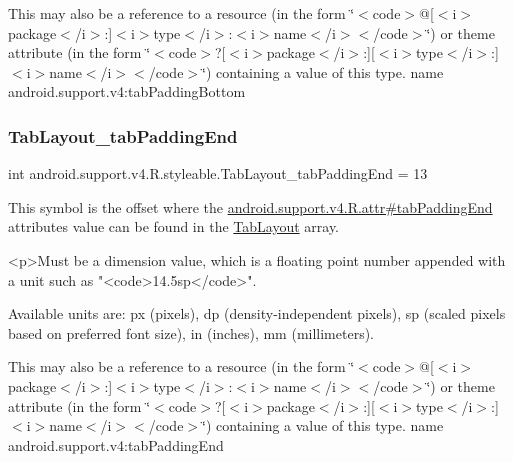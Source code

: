 This may also be a reference to a resource (in the form \char`\"{}$<$code$>$@\mbox{[}$<$i$>$package$<$/i$>$\+:\mbox{]}$<$i$>$type$<$/i$>$\+:$<$i$>$name$<$/i$>$$<$/code$>$\char`\"{}) or theme attribute (in the form \char`\"{}$<$code$>$?\mbox{[}$<$i$>$package$<$/i$>$\+:\mbox{]}\mbox{[}$<$i$>$type$<$/i$>$\+:\mbox{]}$<$i$>$name$<$/i$>$$<$/code$>$\char`\"{}) containing a value of this type.  name android.\+support.\+v4\+:tab\+Padding\+Bottom \mbox{\label{classandroid_1_1support_1_1v4_1_1R_1_1styleable_a89b79e5b865d6a39d504534559653673}} 
\subsubsection{\texorpdfstring{Tab\+Layout\+\_\+tab\+Padding\+End}{TabLayout\_tabPaddingEnd}}
{\footnotesize\ttfamily int android.\+support.\+v4.\+R.\+styleable.\+Tab\+Layout\+\_\+tab\+Padding\+End = 13\hspace{0.3cm}{\ttfamily [static]}}

This symbol is the offset where the \hyperlink{classandroid_1_1support_1_1v4_1_1R_1_1attr_a3c00f29ec303b55023371ac28507ec3b}{android.\+support.\+v4.\+R.\+attr\#tab\+Padding\+End} attribute\textquotesingle{}s value can be found in the \hyperlink{classandroid_1_1support_1_1v4_1_1R_1_1styleable_a48e866d7121b40ef0bb3d467759606a9}{Tab\+Layout} array.

\begin{DoxyVerb}      <p>Must be a dimension value, which is a floating point number appended with a unit such as "<code>14.5sp</code>".
\end{DoxyVerb}
 Available units are\+: px (pixels), dp (density-\/independent pixels), sp (scaled pixels based on preferred font size), in (inches), mm (millimeters). 

This may also be a reference to a resource (in the form \char`\"{}$<$code$>$@\mbox{[}$<$i$>$package$<$/i$>$\+:\mbox{]}$<$i$>$type$<$/i$>$\+:$<$i$>$name$<$/i$>$$<$/code$>$\char`\"{}) or theme attribute (in the form \char`\"{}$<$code$>$?\mbox{[}$<$i$>$package$<$/i$>$\+:\mbox{]}\mbox{[}$<$i$>$type$<$/i$>$\+:\mbox{]}$<$i$>$name$<$/i$>$$<$/code$>$\char`\"{}) containing a value of this type.  name android.\+support.\+v4\+:tab\+Padding\+End \mbox{\label{classandroid_1_1support_1_1v4_1_1R_1_1styleable_af995762d21ce21572c50a4d2905ccc22}} 
